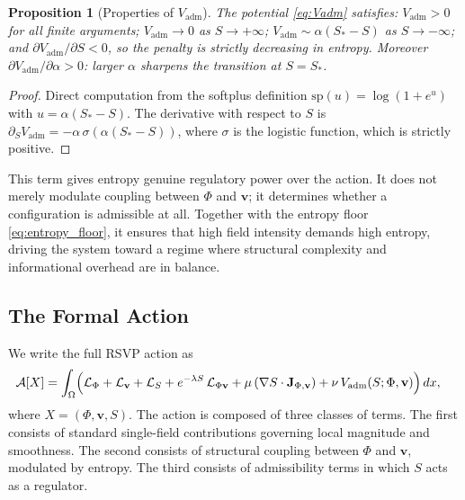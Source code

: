 \documentclass[11pt]{article}
\newtheorem{proposition}[theorem]{Proposition}
\theoremstyle{definition}
\begin{document}
\begin{proposition}[Properties of $V_{\mathrm{adm}}$]
  \label{prop:Vadm}
  The potential \eqref{eq:Vadm} satisfies: $V_{\mathrm{adm}} > 0$ for all
  finite arguments; $V_{\mathrm{adm}} \to 0$ as $S \to +\infty$;
  $V_{\mathrm{adm}} \sim \alpha(S_* - S)$ as $S \to -\infty$; and
  $\partial V_{\mathrm{adm}}/\partial S < 0$, so the penalty is strictly
  decreasing in entropy. Moreover $\partial V_{\mathrm{adm}}/\partial \alpha > 0$:
  larger $\alpha$ sharpens the transition at $S = S_*$.
\end{proposition}

\begin{proof}
  Direct computation from the softplus definition $\mathrm{sp}(u) =
  \log(1+e^u)$ with $u = \alpha(S_* - S)$.
  The derivative with respect to $S$ is
  $\partial_S V_{\mathrm{adm}} = -\alpha\,\sigma(\alpha(S_*-S))$,
  where $\sigma$ is the logistic function, which is strictly positive.
\end{proof}

This term gives entropy genuine regulatory power over the action. It does not
merely modulate coupling between $\Phi$ and $\mathbf{v}$; it determines whether
a configuration is admissible at all. Together with the entropy floor
\eqref{eq:entropy_floor}, it ensures that high field intensity demands high
entropy, driving the system toward a regime where structural complexity and
informational overhead are in balance.

\subsection{The Formal Action}

We write the full RSVP action as
\begin{align}
  \mathcal{A}[X]
  &= \int_\Omega
    \Bigl(
      \mathcal{L}_\Phi
      + \mathcal{L}_{\mathbf{v}}
      + \mathcal{L}_S
      + e^{-\lambda S}\,\mathcal{L}_{\Phi\mathbf{v}}
      + \mu\,(\nabla S \cdot \mathbf{J}_{\Phi,\mathbf{v}})
      + \nu\,V_{\mathrm{adm}}(S;\Phi,\mathbf{v})
    \Bigr)\,dx,
    \label{eq:full_action}
\end{align}
where $X = (\Phi,\mathbf{v},S)$. The action is composed of three classes of
terms. The first consists of standard single-field contributions governing local
magnitude and smoothness. The second consists of structural coupling between
$\Phi$ and $\mathbf{v}$, modulated by entropy. The third consists of
admissibility terms in which $S$ acts as a regulator.
\end{document}
